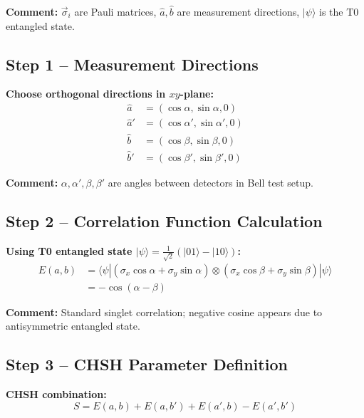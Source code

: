 \documentclass[12pt,a4paper]{article}
\begin{document}
\textbf{Comment:} $\vec{\sigma}_i$ are Pauli matrices, $\hat{a}, \hat{b}$ are measurement directions, $|\psi\rangle$ is the T0 entangled state.

\subsection{Step 1 – Measurement Directions}

\textbf{Choose orthogonal directions in $xy$-plane:}
\begin{align}
	\hat{a} &= (\cos \alpha, \sin \alpha, 0) \\
	\hat{a}' &= (\cos \alpha', \sin \alpha', 0) \\
	\hat{b} &= (\cos \beta, \sin \beta, 0) \\
	\hat{b}' &= (\cos \beta', \sin \beta', 0)
\end{align}

\textbf{Comment:} $\alpha,\alpha',\beta,\beta'$ are angles between detectors in Bell test setup.

\subsection{Step 2 – Correlation Function Calculation}

\textbf{Using T0 entangled state $|\psi\rangle = \frac{1}{\sqrt{2}}(|01\rangle - |10\rangle)$:}
\begin{align}
	E(a,b) &= \langle \psi | (\sigma_x \cos\alpha + \sigma_y \sin\alpha) \otimes (\sigma_x \cos\beta + \sigma_y \sin\beta) | \psi \rangle \\
	&= -\cos(\alpha - \beta)
\end{align}

\textbf{Comment:} Standard singlet correlation; negative cosine appears due to antisymmetric entangled state.

\subsection{Step 3 – CHSH Parameter Definition}

\textbf{CHSH combination:}
\begin{equation}
	S = E(a,b) + E(a,b') + E(a',b) - E(a',b')
\end{equation}
\end{document}
